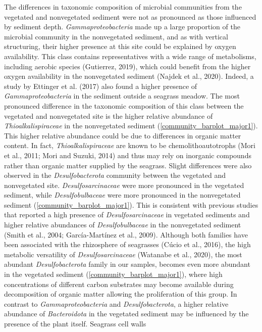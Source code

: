 \documentclass[12pt,]{article}
\begin{document}
The differences in taxonomic composition of microbial communities from
the vegetated and nonvegetated sediment were not as pronounced as those
influenced by sediment depth. \emph{Gammaproteobacteria} made up a large
proportion of the microbial community in the nonvegetated sediment, and
as with vertical structuring, their higher presence at this site could
be explained by oxygen availability. This class contains representatives
with a wide range of metabolisms, including aerobic species (Gutierrez,
2019), which could benefit from the higher oxygen availability in the
nonvegetated sediment (Najdek et al., 2020). Indeed, a study by Ettinger
et al. (2017) also found a higher presence of \emph{Gammaproteobacteria}
in the sediment outside a seagrass meadow. The most pronounced
difference in the taxonomic composition of this class between the
vegetated and nonvegetated site is the higher relative abundance of
\emph{Thioalkalispiraceae} in the nonvegetated sediment
(\autoref {community_barplot_major1}). This higher relative abundance
could be due to differences in organic matter content. In fact,
\emph{Thioalkalispiraceae} are known to be chemolithoautotrophs (Mori et
al., 2011; Mori and Suzuki, 2014) and thus may rely on inorganic
compounds rather than organic matter supplied by the seagrass. Slight
differences were also observed in the \emph{Desulfobacterota} community
between the vegetated and nonvegetated site. \emph{Desulfosarcinaceae}
were more pronounced in the vegetated sediment, while
\emph{Desulfobulbaceae} were more pronounced in the nonvegetated
sediment (\autoref {community_barplot_major1}). This is consistent with
previous studies that reported a high presence of
\emph{Desulfosarcinaceae} in vegetated sediments and higher relative
abundances of \emph{Desulfobulbaceae} in the nonvegetated sediment
(Smith et al., 2004; García-Martínez et al., 2009). Although both
families have been associated with the rhizosphere of seagrasses (Cúcio
et al., 2016), the high metabolic versatility of
\emph{Desulfosarcinaceae} (Watanabe et al., 2020), the most abundant
\emph{Desulfobacterota} family in our samples, becomes even more
abundant in the vegetated sediment
(\autoref {community_barplot_major1}), where high concentrations of
different carbon substrates may become available during decomposition of
organic matter allowing the proliferation of this group. In contrast to
\emph{Gammaproteobacteria} and \emph{Desulfobacterota}, a higher
relative abundance of \emph{Bacteroidota} in the vegetated sediment may
be influenced by the presence of the plant itself. Seagrass cell walls
\end{document}
